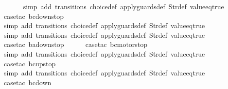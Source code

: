 \begin{isabellebody}
\ \ \ \ \ \isamarkupfalse%
\ {\isacharparenleft}simp\ add{\isacharcolon}\ transitions\ choice{\isacharunderscore}def\ apply{\isacharunderscore}guards{\isacharunderscore}def\ Str{\isacharunderscore}def\ value{\isacharunderscore}eq{\isacharunderscore}true{\isacharparenright}\isanewline
\ \ \ \ \isamarkupfalse%
\ {\isacharparenleft}case{\isacharunderscore}tac\ {\isachardoublequoteopen}bc{\isacharequal}down{}{}stop{\isachardoublequoteclose}{\isacharparenright}\isanewline
\ \ \ \ \ \isamarkupfalse%
\ {\isacharparenleft}simp\ add{\isacharcolon}\ transitions\ choice{\isacharunderscore}def\ apply{\isacharunderscore}guards{\isacharunderscore}def\ Str{\isacharunderscore}def\ value{\isacharunderscore}eq{\isacharunderscore}true{\isacharparenright}\isanewline
\ \ \isamarkupfalse%
\ {\isacharparenleft}simp\ add{\isacharcolon}\ transitions\ choice{\isacharunderscore}def\ apply{\isacharunderscore}guards{\isacharunderscore}def\ Str{\isacharunderscore}def\ value{\isacharunderscore}eq{\isacharunderscore}true{\isacharparenright}\isanewline
\ \isamarkupfalse%
\ {\isacharparenleft}case{\isacharunderscore}tac\ {\isachardoublequoteopen}ba{\isacharequal}down{}{}stop{\isachardoublequoteclose}{\isacharparenright}\isanewline
\ \ \ \ \isamarkupfalse%
\ {\isacharparenleft}case{\isacharunderscore}tac\ {\isachardoublequoteopen}bc{\isacharequal}motorstop{}{\isachardoublequoteclose}{\isacharparenright}\isanewline
\ \ \ \ \ \isamarkupfalse%
\ {\isacharparenleft}simp\ add{\isacharcolon}\ transitions\ choice{\isacharunderscore}def\ apply{\isacharunderscore}guards{\isacharunderscore}def\ Str{\isacharunderscore}def\ value{\isacharunderscore}eq{\isacharunderscore}true{\isacharparenright}\isanewline
\ \ \ \ \isamarkupfalse%
\ {\isacharparenleft}case{\isacharunderscore}tac\ {\isachardoublequoteopen}bc{\isacharequal}up{}{}stop{\isachardoublequoteclose}{\isacharparenright}\isanewline
\ \ \ \ \ \isamarkupfalse%
\ {\isacharparenleft}simp\ add{\isacharcolon}\ transitions\ choice{\isacharunderscore}def\ apply{\isacharunderscore}guards{\isacharunderscore}def\ Str{\isacharunderscore}def\ value{\isacharunderscore}eq{\isacharunderscore}true{\isacharparenright}\isanewline
\ \ \ \ \isamarkupfalse%
\ {\isacharparenleft}case{\isacharunderscore}tac\ {\isachardoublequoteopen}bc{\isacharequal}down{}{}{\isachardoublequoteclose}{\isacharparenright}\isanewline

\end{isabellebody}
